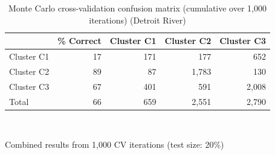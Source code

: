 \begin{table}[htbp]
  \centering
  \caption{Monte Carlo cross-validation confusion matrix (cumulative over 1,000 iterations) (Detroit River)}
  \label{tab:dr_03_LDA_Classification_mccv_confusion_matrix}
  \begin{tabular}{lrrrr}
    \toprule
     & \% Correct & Cluster C1 & Cluster C2 & Cluster C3 \\
    \midrule
    Cluster C1 & 17 & 171 & 177 & 652 \\
    Cluster C2 & 89 & 87 & 1{,}783 & 130 \\
    Cluster C3 & 67 & 401 & 591 & 2{,}008 \\
    Total & 66 & 659 & 2{,}551 & 2{,}790 \\
    \bottomrule
  \end{tabular}
  \\[4pt]
  \parbox{\textwidth}{\footnotesize Combined results from 1,000 CV iterations (test size: 20\%)}
\end{table}
